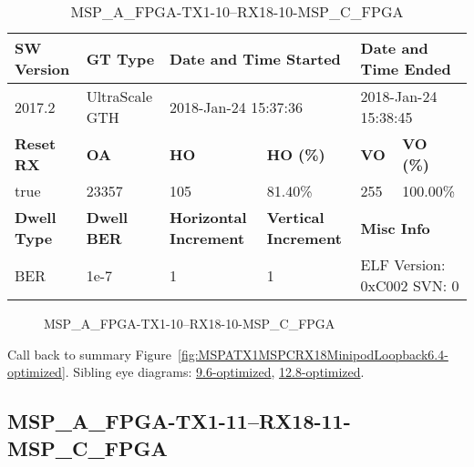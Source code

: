 \begin{table}[h]
\centering
\caption{MSP\_A\_FPGA-TX1-10--RX18-10-MSP\_C\_FPGA}
\label{tab:MSPAFPGATX110RX1810MSPCFPGA6.4-optimized}
\begin{tabular}{@{}|l|l|l|l|l|l|@{}}
\toprule
\textbf{SW Version}                & \textbf{GT Type}   & \multicolumn{2}{l|}{\textbf{Date and Time Started}}            & \multicolumn{2}{l|}{\textbf{Date and Time Ended}}        \\ \midrule
2017.2                       & UltraScale GTH          & \multicolumn{2}{l|}{2018-Jan-24 15:37:36}                   & \multicolumn{2}{l|}{2018-Jan-24 15:38:45}               \\ \midrule
\textbf{Reset RX}                  & \textbf{OA} & \textbf{HO}   & \textbf{HO (\%)} & \textbf{VO} & \textbf{VO (\%)} \\ \midrule
true & 23357        & 105          & 81.40\%        & 255        & 100.00\%       \\ \midrule
\textbf{Dwell Type}                & \textbf{Dwell BER} & \textbf{Horizontal Increment} & \textbf{Vertical Increment}    & \multicolumn{2}{l|}{\textbf{Misc Info}}                  \\ \midrule
BER                            & 1e-7        & 1        & 1           & \multicolumn{2}{l|}{ELF Version: 0xC002 SVN: 0}                         \\ \bottomrule
\end{tabular}
\end{table}

\begin{figure}[h]
\caption{MSP\_A\_FPGA-TX1-10--RX18-10-MSP\_C\_FPGA} \label{fig:MSPAFPGATX110RX1810MSPCFPGA6.4-optimized}
\end{figure}

Call back to summary Figure~\ref{fig:MSPATX1MSPCRX18MinipodLoopback6.4-optimized}.
Sibling eye diagrams: \hyperref[sec:MSPAFPGATX110RX1810MSPCFPGA9.6-optimized]{9.6-optimized}, \hyperref[sec:MSPAFPGATX110RX1810MSPCFPGA12.8-optimized]{12.8-optimized}.

\clearpage
\newpage


\subsection{MSP\_A\_FPGA-TX1-11--RX18-11-MSP\_C\_FPGA}\label{sec:MSPAFPGATX111RX1811MSPCFPGA6.4-optimized}

